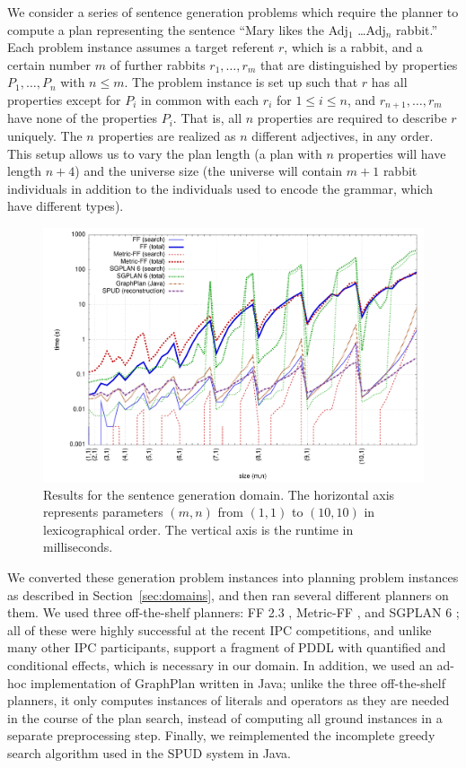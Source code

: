 We consider a series of sentence generation problems which require the
planner to compute a plan representing the sentence ``Mary likes the
Adj$_1$ \ldots Adj$_n$ rabbit.''  Each problem instance assumes a
target referent $r$, which is a rabbit, and a certain number $m$ of
further rabbits $r_1,\ldots,r_m$ that are distinguished by properties
$P_1,\ldots,P_n$ with $n \leq m$. The problem instance is set up such
that $r$ has all properties except for $P_i$ in common with each $r_i$
for $1 \leq i \leq n$, and $r_{n+1},\ldots,r_m$ have none of the
properties $P_i$. That is, all $n$ properties are required to describe
$r$ uniquely. The $n$ properties are realized as $n$ different
adjectives, in any order.  This setup allows us to vary the plan
length (a plan with $n$ properties will have length $n+4$) and the
universe size (the universe will contain $m+1$ rabbit individuals in
addition to the individuals used to encode the grammar, which have
different types).

\begin{figure}
  \centering
  \includegraphics[width=\columnwidth]{data/modifiers-all}
  \caption{Results for the sentence generation domain. The
    horizontal axis represents parameters $(m,n)$ from $(1,1)$ to
    $(10,10)$ in lexicographical order. The vertical axis is the
    runtime in milliseconds.}
  \label{fig:runtimes-crisp}
\end{figure}

We converted these generation problem instances into planning problem
instances as described in Section~\ref{sec:domains}, and then ran
several different planners on them. We used three off-the-shelf
planners: FF 2.3 \citep{HoffmannNebel01}, Metric-FF
\citep{hoffmann:ecai-02}, and SGPLAN 6
\citep{hsu06:_new_featur_in_sgplan_for}; all of these were highly
successful at the recent IPC competitions, and unlike many other IPC
participants, support a fragment of PDDL with quantified and
conditional effects, which is necessary in our domain. In addition, we
used an ad-hoc implementation of GraphPlan \citep{Blum1997} written in
Java; unlike the three off-the-shelf planners, it only computes
instances of literals and operators as they are needed in the course
of the plan search, instead of computing all ground instances in a
separate preprocessing step. Finally, we reimplemented the incomplete
greedy search algorithm used in the SPUD system \citep{Stone2003a} in
Java.

